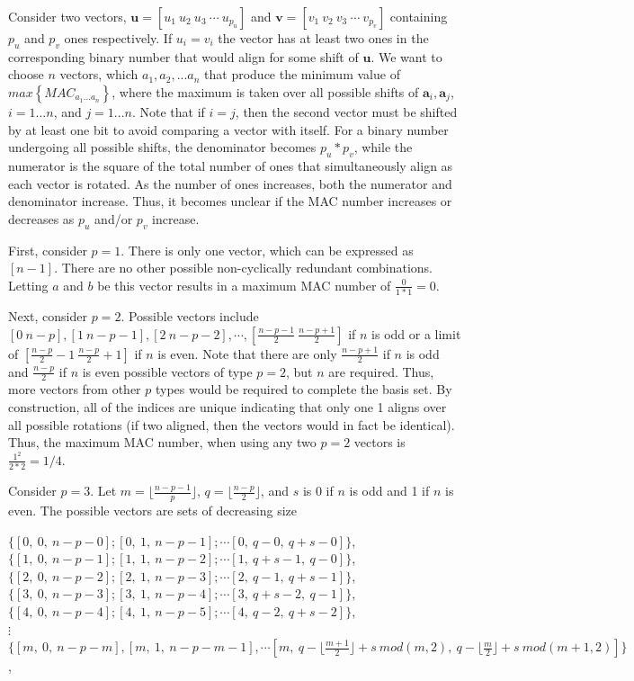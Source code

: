 \documentclass[3p,times]{elsarticle}
\begin{document}
Consider two vectors, $\textbf{u}=\left[u_1\ u_2\ u_3\ \cdots\ u_{p_u}\right]$ and $\textbf{v}=\left[v_1\ v_2\ v_3\ \cdots\ v_{p_v}\right]$ containing $p_u$ and $p_v$ ones respectively.  
If $u_i=v_i$ the vector has at least two ones in the corresponding binary number that would align for some shift of $\textbf{u}$.  
We want to choose $n$ vectors, which $a_1, a_2, ... a_n$ that produce the minimum value of $max\left\{MAC_{a_1...a_n}\right\}$, where the maximum is taken over all possible shifts of $\textbf{a}_i, \textbf{a}_j$, $i=1...n$, and $j=1...n$.  
Note that if $i=j$, then the second vector must be shifted by at least one bit to avoid comparing a vector with itself.  
For a binary number undergoing all possible shifts, the denominator becomes $p_u * p_v$, while the numerator is the square of the total number of ones that simultaneously align as each vector is rotated.  
As the number of ones increases, both the numerator and denominator increase.   
Thus, it becomes unclear if the MAC number increases or decreases as $p_u$ and/or $p_v$ increase.

First, consider $p=1$.  
There is only one vector, which can be expressed as $\left[n-1\right]$.  
There are no other possible non-cyclically redundant combinations.  
Letting $a$ and $b$ be this vector results in a maximum MAC number of $\frac{0}{1*1}=0$.

Next, consider $p=2$.  
Possible vectors include $[0\ n-p], [1\  n-p-1], [2\ n-p-2], \cdots, [\frac{n-p-1}{2}\ \frac{n-p+1}{2}]$ if $n$ is odd or a limit of $[\frac{n-p}{2}-1\ \frac{n-p}{2}+1]$ if $n$ is even. 
Note that there are only $\frac{n-p+1}{2}$ if $n$ is odd and $\frac{n-p}{2}$ if $n$ is even possible vectors of type $p=2$, but $n$ are required.  
Thus, more vectors from other $p$ types would be required to complete the basis set.  
By construction, all of the indices are unique indicating that only one 1 aligns over all possible rotations (if two aligned, then the vectors would in fact be identical). 
Thus, the maximum MAC number, when using any two $p=2$ vectors is $\frac{1^2}{2*2}=1/4$.

Consider $p=3$.  
Let $m=\lfloor\frac{n-p-1}{p}\rfloor$, $q=\lfloor\frac{n-p}{2}\rfloor$, and $s$ is 0 if $n$ is odd and 1 if $n$ is even. 
The possible vectors are sets of decreasing size

\begin{center}
$\{[0,\ 0,\ n-p-0]; [0,\ 1,\ n-p-1]; \cdots [0,\ q-0,\ q+s-0]\}$,\\
$\{[1,\ 0,\ n-p-1]; [1,\ 1,\ n-p-2]; \cdots [1,\ q+s-1,\ q-0]\}$,\\
$\{[2,\ 0,\ n-p-2]; [2,\ 1,\ n-p-3]; \cdots [2,\ q-1,\ q+s-1]\}$,\\
$\{[3,\ 0,\ n-p-3]; [3,\ 1,\ n-p-4]; \cdots [3,\ q+s-2,\ q-1]\}$,\\
$\{[4,\ 0,\ n-p-4]; [4,\ 1,\ n-p-5]; \cdots [4,\ q-2,\ q+s-2]\}$,\\
$\vdots$ \\
$\{[m,\ 0,\ n-p-m], [m,\ 1,\ n-p-m-1], \cdots [m,\ q-\lfloor \frac{m+1}{2}\rfloor+s\ mod(m,2),\ q-\lfloor \frac{m}{2}\rfloor+s\ mod(m+1,2)]\}$,
\end{center}
\end{document}
